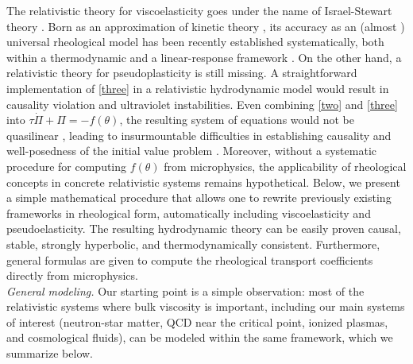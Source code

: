 \documentclass[aps,prl,noshowpacs,noshowkeys,floatfix,superscriptaddress,singlecolum,nofootinbib]{revtex4-2}
\theoremstyle{definition}
\theoremstyle{theorem}
\begin{document}
The relativistic theory for viscoelasticity goes under the name of Israel-Stewart theory \cite{MIS-6,Hiscock_Lindblom_stability_1983}. Born as an approximation of kinetic theory \cite{Denicol2012Boltzmann}, its accuracy as an (almost \cite{Heller2014}) universal rheological model has been recently established systematically, both within a thermodynamic \cite{GavassinoUniversalityI,GavassinoUniversalityII2023} and a linear-response framework \cite{WagnerGavassino2023}. On the other hand, a relativistic theory for pseudoplasticity is still missing. A straightforward implementation of \eqref{three} in a relativistic hydrodynamic model would result in causality violation and ultraviolet instabilities. Even combining \eqref{two} and \eqref{three} into $\tau \dot{\Pi}+\Pi =-f(\theta)$, the resulting system of equations would not be quasilinear \cite{ChoquetBruhatGRBook}, leading to insurmountable difficulties in establishing causality and well-posedness of the initial value problem \cite{Disconzi:2023rtt}. Moreover, without a systematic procedure for computing $f(\theta)$ from microphysics, the applicability of rheological concepts in concrete relativistic systems remains hypothetical. Below, we present a simple mathematical procedure that allows one to rewrite previously existing frameworks in rheological form, automatically including viscoelasticity and pseudoelasticity. The resulting hydrodynamic theory can be easily proven causal, stable, strongly hyperbolic, and thermodynamically consistent. Furthermore, general formulas are given to compute the rheological transport coefficients directly from microphysics.\\

\noindent \textit{General modeling.} Our starting point is a simple observation: most of the relativistic systems where bulk viscosity is important, including our main systems of interest (neutron-star matter, QCD near the critical point, ionized plasmas, and cosmological fluids), can be modeled within the same framework, which we summarize below. 
\end{document}
